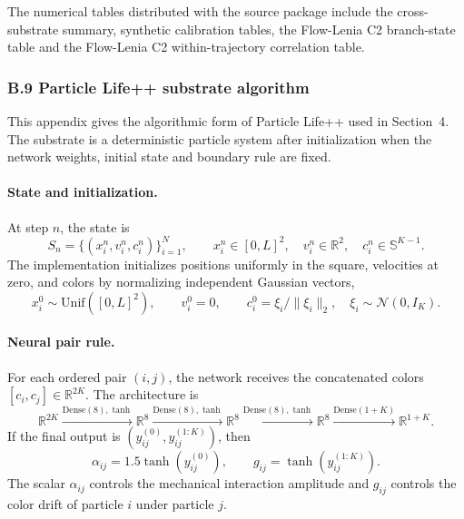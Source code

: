 The numerical tables distributed with the source package include the cross-substrate summary, synthetic calibration tables, the Flow-Lenia C2 branch-state table and the Flow-Lenia C2 within-trajectory correlation table.
\subsubsection*{B.9  Particle Life++ substrate algorithm}
\label{app:plife-plus-algorithm}

This appendix gives the algorithmic form of Particle Life++ used in Section~4.  The substrate is a deterministic particle system after initialization when the network weights, initial state and boundary rule are fixed.

\paragraph{State and initialization.}
At step $n$, the state is
\[
  S_n=\{(x_i^n,v_i^n,c_i^n)\}_{i=1}^{N},
  \qquad
  x_i^n\in[0,L]^2,
  \quad v_i^n\in\mathbb R^2,
  \quad c_i^n\in\mathbb S^{K-1}.
\]
The implementation initializes positions uniformly in the square, velocities at zero, and colors by normalizing independent Gaussian vectors,
\[
  x_i^0\sim\mathrm{Unif}([0,L]^2),
  \qquad
  v_i^0=0,
  \qquad
  c_i^0=\xi_i/\|\xi_i\|_2,
  \quad \xi_i\sim\mathcal N(0,I_K).
\]

\paragraph{Neural pair rule.}
For each ordered pair $(i,j)$, the network receives the concatenated colors $[c_i,c_j]\in\mathbb R^{2K}$.  The architecture is
\[
  \mathbb R^{2K}
  \xrightarrow{\mathrm{Dense}(8),\tanh}
  \mathbb R^8
  \xrightarrow{\mathrm{Dense}(8),\tanh}
  \mathbb R^8
  \xrightarrow{\mathrm{Dense}(8),\tanh}
  \mathbb R^8
  \xrightarrow{\mathrm{Dense}(1+K)}
  \mathbb R^{1+K}.
\]
If the final output is $(y_{ij}^{(0)},y_{ij}^{(1:K)})$, then
\[
  \alpha_{ij}=1.5\tanh(y_{ij}^{(0)}),
  \qquad
  g_{ij}=\tanh(y_{ij}^{(1:K)}).
\]
The scalar $\alpha_{ij}$ controls the mechanical interaction amplitude and $g_{ij}$ controls the color drift of particle $i$ under particle $j$.

